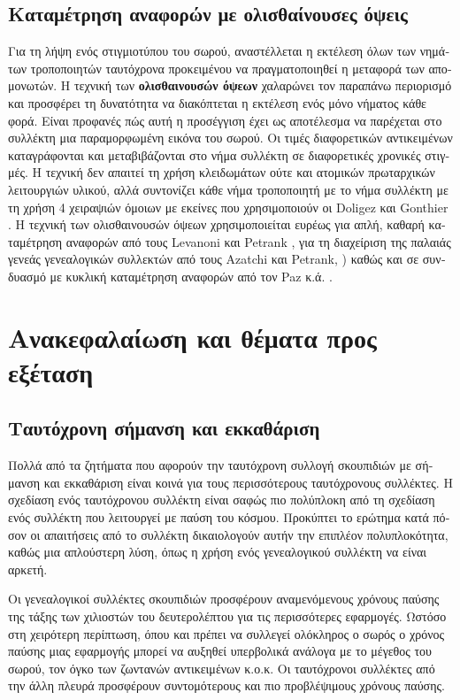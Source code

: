 \begin{greek}
\subsection{Καταμέτρηση αναφορών με ολισθαίνουσες όψεις}
Για τη λήψη ενός στιγμιοτύπου του σωρού, αναστέλλεται η
εκτέλεση όλων των νημάτων τροποποιητών ταυτόχρονα προκειμένου
να πραγματοποιηθεί η μεταφορά των απομονωτών. Η τεχνική των
\textbf{ολισθαινουσών όψεων} χαλαρώνει τον παραπάνω περιορισμό
και προσφέρει τη δυνατότητα να διακόπτεται η εκτέλεση ενός
μόνο νήματος κάθε φορά. Είναι προφανές πώς αυτή η προσέγγιση
έχει ως αποτέλεσμα να παρέχεται στο συλλέκτη μια παραμορφωμένη
εικόνα του σωρού. Οι τιμές διαφορετικών αντικειμένων
καταγράφονται και μεταβιβάζονται στο νήμα συλλέκτη σε
διαφορετικές χρονικές στιγμές. Η τεχνική δεν απαιτεί τη χρήση
κλειδωμάτων ούτε και ατομικών πρωταρχικών λειτουργιών υλικού,
αλλά συντονίζει κάθε νήμα τροποποιητή με το νήμα συλλέκτη με
τη χρήση 4 χειραψιών όμοιων με εκείνες που χρησιμοποιούν οι
Doligez και Gonthier \cite{DBLP:conf/popl/DoligezG94}. Η
τεχνική των ολισθαινουσών όψεων χρησιμοποιείται ευρέως για
απλή, καθαρή καταμέτρηση αναφορών από τους Levanoni και
Petrank \cite{levanoni1999scalable, DBLP:conf/oopsla/LevanoniP01,
DBLP:journals/toplas/LevanoniP06}, για τη διαχείριση της
παλαιάς γενεάς γενεαλογικών συλλεκτών από τους Azatchi και
Petrank, \cite{DBLP:conf/oopsla/AzatchiLPP03}) καθώς και
σε συνδυασμό με κυκλική καταμέτρηση αναφορών από τον Paz
κ.ά. \cite{DBLP:conf/cc/PazPBKR05, DBLP:conf/cc/PazP07}.

\section{Ανακεφαλαίωση και θέματα προς εξέταση}
\subsection{Ταυτόχρονη σήμανση και εκκαθάριση}
Πολλά από τα ζητήματα που αφορούν την ταυτόχρονη συλλογή
σκουπιδιών με σήμανση και εκκαθάριση είναι κοινά για τους
περισσότερους ταυτόχρονους συλλέκτες. Η σχεδίαση ενός
ταυτόχρονου συλλέκτη είναι σαφώς πιο πολύπλοκη από τη
σχεδίαση ενός συλλέκτη που λειτουργεί με παύση του κόσμου.
Προκύπτει το ερώτημα κατά πόσον οι απαιτήσεις από το συλλέκτη
δικαιολογούν αυτήν την επιπλέον πολυπλοκότητα, καθώς μια
απλούστερη λύση, όπως η χρήση ενός γενεαλογικού συλλέκτη
να είναι αρκετή.

Οι γενεαλογικοί συλλέκτες σκουπιδιών προσφέρουν αναμενόμενους
χρόνους παύσης της τάξης των χιλιοστών του δευτερολέπτου για
τις περισσότερες εφαρμογές. Ωστόσο στη χειρότερη περίπτωση,
όπου και πρέπει να συλλεγεί ολόκληρος ο σωρός ο χρόνος παύσης
μιας εφαρμογής μπορεί να αυξηθεί υπερβολικά ανάλογα με το
μέγεθος του σωρού, τον όγκο των ζωντανών αντικειμένων κ.ο.κ.
Οι ταυτόχρονοι συλλέκτες από την άλλη πλευρά προσφέρουν
συντομότερους και πιο προβλέψιμους χρόνους παύσης.


\end{greek}
